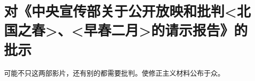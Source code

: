 \section[对《中央宣传部关于公开放映和批判<北国之春>、<早春二月>的请示报告》的批示（一九六四年八月）]{对《中央宣传部关于公开放映和批判<北国之春>、<早春二月>的请示报告》的批示}


可能不只这两部影片，还有别的都需要批判。使修正主义材料公布于众。


